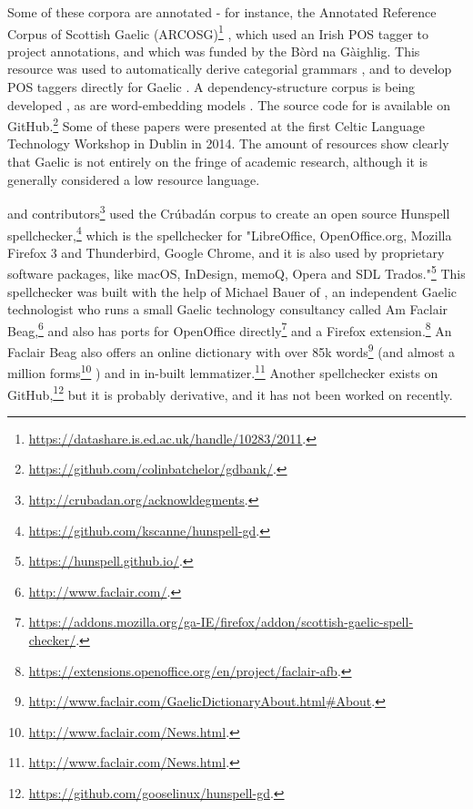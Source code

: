 Some of these corpora are annotated - for instance, the Annotated Reference Corpus of Scottish Gaelic (ARCOSG)\footnote{\href{https://datashare.is.ed.ac.uk/handle/10283/2011}{https://datashare.is.ed.ac.uk/handle/10283/2011}. } \citep{ARCOSG2016, lamb2014scottish}, which used an Irish POS tagger \citep{ui2006part} to project annotations, and which was funded by the B\`ord na G\`aighlig. This resource was used to automatically derive categorial grammars \citep{batchelor2016automatic}, and to develop POS taggers directly for Gaelic \citep{lamb2014developing}. A dependency-structure corpus is being developed \citep{batchelor2014gdbank}, as are word-embedding models \citep{lamb2016developing}. The source code for \citet{batchelor2014gdbank, batchelor2016automatic} is available on GitHub.\footnote{\href{https://github.com/colinbatchelor/gdbank/}{https://github.com/colinbatchelor/gdbank/}. } Some of these papers were presented at the first Celtic Language Technology Workshop in Dublin in 2014. The amount of resources show clearly that Gaelic is not entirely on the fringe of academic research, although it is generally considered a low resource language.

\citet{scannell2007crubadan} and contributors\footnote{\href{http://crubadan.org/acknowldegments}{http://crubadan.org/acknowldegments}. } used the Cr\'ubad\'an corpus to create an open source Hunspell spellchecker,\footnote{\href{https://github.com/kscanne/hunspell-gd}{https://github.com/kscanne/hunspell-gd}. } which is the spellchecker for "LibreOffice, OpenOffice.org, Mozilla Firefox 3 and Thunderbird, Google Chrome, and it is also used by proprietary software packages, like macOS, InDesign, memoQ, Opera and SDL Trados."\footnote{\href{https://hunspell.github.io/}{https://hunspell.github.io/}. } This spellchecker was built with the help of Michael Bauer of \citet{bauer2014salt}, an independent Gaelic technologist who runs a small Gaelic technology consultancy called Am Faclair Beag,\footnote{\href{http://www.faclair.com/}{http://www.faclair.com/}. } and also has ports for OpenOffice directly\footnote{\href{https://addons.mozilla.org/ga-IE/firefox/addon/scottish-gaelic-spell-checker/}{https://addons.mozilla.org/ga-IE/firefox/addon/scottish-gaelic-spell-checker/}. } and a Firefox extension.\footnote{\href{https://extensions.openoffice.org/en/project/faclair-afb}{https://extensions.openoffice.org/en/project/faclair-afb}. } An Faclair Beag also offers an online dictionary with over 85k words\footnote{\href{http://www.faclair.com/GaelicDictionaryAbout.html\#About}{http://www.faclair.com/GaelicDictionaryAbout.html\#About}. }
(and almost a million forms\footnote{\href{http://www.faclair.com/News.html}{http://www.faclair.com/News.html}. } \citep{bauer2014salt}) and in in-built lemmatizer.\footnote{\href{http://www.faclair.com/News.html}{http://www.faclair.com/News.html}. } Another spellchecker exists on GitHub,\footnote{\href{https://github.com/gooselinux/hunspell-gd}{https://github.com/gooselinux/hunspell-gd}. } but it is probably derivative, and it has not been worked on recently.

